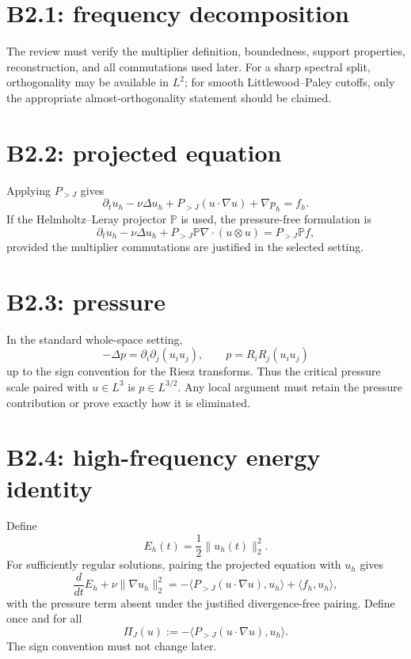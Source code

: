 \documentclass[11pt]{article}
\begin{document}
\section{B2.1: frequency decomposition}
The review must verify the multiplier definition, boundedness, support properties, reconstruction, and all commutations used later. For a sharp spectral split, orthogonality may be available in $L^2$; for smooth Littlewood--Paley cutoffs, only the appropriate almost-orthogonality statement should be claimed.

\section{B2.2: projected equation}
Applying $P_{>J}$ gives
\begin{equation}
 \partial_tu_h-\nu\Delta u_h+P_{>J}(u\cdot\nabla u)+\nabla p_h=f_h.
\end{equation}
If the Helmholtz--Leray projector $\mathbb P$ is used, the pressure-free formulation is
\[
\partial_tu_h-\nu\Delta u_h+P_{>J}\mathbb P\nabla\cdot(u\otimes u)=P_{>J}\mathbb P f,
\]
provided the multiplier commutations are justified in the selected setting.

\section{B2.3: pressure}
In the standard whole-space setting,
\[
-\Delta p=\partial_i\partial_j(u_i u_j),
\qquad
p=R_iR_j(u_i u_j)
\]
up to the sign convention for the Riesz transforms. Thus the critical pressure scale paired with $u\in L^3$ is $p\in L^{3/2}$. Any local argument must retain the pressure contribution or prove exactly how it is eliminated.

\section{B2.4: high-frequency energy identity}
Define
\[
E_h(t)=\frac12\|u_h(t)\|_2^2.
\]
For sufficiently regular solutions, pairing the projected equation with $u_h$ gives
\begin{equation}
\frac{d}{dt}E_h+\nu\|\nabla u_h\|_2^2
=-\langle P_{>J}(u\cdot\nabla u),u_h\rangle
+\langle f_h,u_h\rangle,
\end{equation}
with the pressure term absent under the justified divergence-free pairing. Define once and for all
\[
\Pi_J(u):=-\langle P_{>J}(u\cdot\nabla u),u_h\rangle.
\]
The sign convention must not change later.
\end{document}
